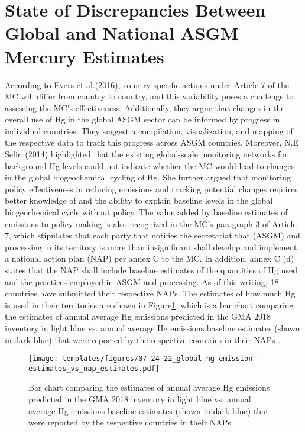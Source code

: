 \section{State of Discrepancies Between Global and National ASGM Mercury Estimates}
According to Evers et al.(2016), country-specific actions under Article 7 of the MC will differ from country to country, and this variability poses a challenge to assessing the MC's effectiveness. Additionally, they argue that changes in the overall use of Hg in the global ASGM sector can be informed by progress in individual countries. They suggest a compilation, visualization, and mapping of the respective data to track this progress across ASGM countries. Moreover, N.E Selin (2014) highlighted that the existing global-scale monitoring networks for background Hg levels could not indicate whether the MC would lead to changes in the global biogeochemical cycling of Hg. She further argued that monitoring policy effectiveness in reducing emissions and tracking potential changes requires better knowledge of and the ability to explain baseline levels in the global biogeochemical cycle without policy. The value added by baseline estimates of emissions to policy making is also recognized in the MC's paragraph 3 of Article 7, which stipulates that each party that notifies the secretariat that (ASGM) and processing in its territory is more than insignificant shall develop and implement a national action plan (NAP) per annex C to the MC. In addition, annex C (d) states that the NAP shall include baseline estimates of the quantities of Hg used and the practices employed in ASGM and processing. As of this writing, 18 countries have submitted their respective NAPs. The estimates of how much Hg is used in their territories are shown in Figure\ref{fig:global-hg-emission-estimates_vs_nap_estimates}, which is a bar chart comparing the estimates of annual average Hg emissions predicted in the GMA 2018 inventory in light blue vs. annual average Hg emissions baseline estimates (shown in dark blue) that were reported by the respective countries in their NAPs \cite{united_nations_environment_programme_technical_2019}.

\begin{figure}[H]
  \texttt{[image: templates/figures/07-24-22\_global-hg-emission-estimates\_vs\_nap\_estimates.pdf]}
  \centering
  \caption{Bar chart comparing the estimates of annual average Hg emissions predicted in the GMA 2018 inventory in light blue vs. annual average Hg emissions baseline estimates (shown in dark blue) that were reported by the respective countries in their NAPs \cite{united_nations_environment_programme_technical_2019} }
  \label{fig:global-hg-emission-estimates_vs_nap_estimates}
\end{figure}
\FloatBarrier


